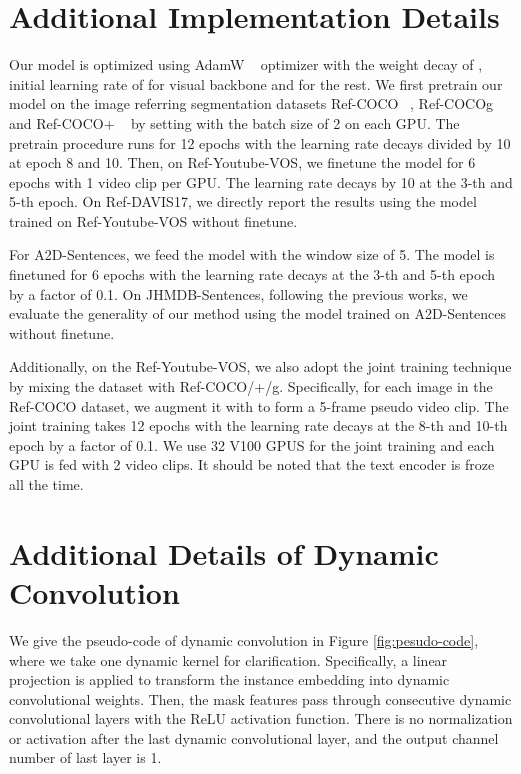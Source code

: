 \documentclass[10pt,twocolumn,letterpaper]{article}
\begin{document}
{\section{Additional Implementation Details}

Our model is optimized using AdamW ~\cite{loshchilov2017adamw} optimizer with the weight decay of , initial learning rate of  for visual backbone and  for the rest. We first pretrain our model on the image referring segmentation datasets Ref-COCO ~\cite{yu2016refcoco}, Ref-COCOg ~\cite{yu2016refcoco} and Ref-COCO+ ~\cite{mao2016refcoco+} by setting  with the batch size of 2 on each GPU. The pretrain procedure runs for 12 epochs with the learning rate decays divided by 10 at epoch 8 and 10. Then, on Ref-Youtube-VOS, we finetune the model for 6 epochs with 1 video clip per GPU. The learning rate decays by 10 at the 3-th and 5-th epoch. On Ref-DAVIS17, we directly report the results using the model trained on Ref-Youtube-VOS without finetune.

For A2D-Sentences, we feed the model with the window size of 5. The model is finetuned for 6 epochs with the learning rate decays at the 3-th and 5-th epoch by a factor of 0.1. On JHMDB-Sentences, following the previous works, we evaluate the generality of our method using the model trained on A2D-Sentences without finetune.

Additionally, on the Ref-Youtube-VOS, we also adopt the joint training technique by mixing the dataset with Ref-COCO/+/g. Specifically, for each image in the Ref-COCO dataset, we augment it with  to form a 5-frame pseudo video clip. The joint training takes 12 epochs with the learning rate decays at the 8-th and 10-th epoch by a factor of 0.1. We use 32 V100 GPUS for the joint training and each GPU is fed with 2 video clips. It should be noted that the text encoder is froze all the time.

\section{Additional Details of Dynamic Convolution}

We give the pseudo-code of dynamic convolution in Figure \ref{fig:pesudo-code}, where we take one dynamic kernel for clarification. Specifically, a linear projection is applied to transform the instance embedding into dynamic convolutional weights. Then, the mask features pass through consecutive dynamic convolutional layers with the ReLU activation function. There is no normalization or activation after the last dynamic convolutional layer, and the output channel number of last layer is 1.

}
\end{document}
